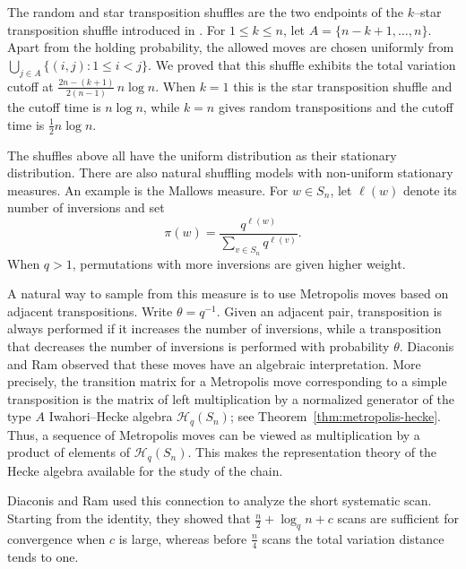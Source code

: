 \documentclass[11pt]{article}
\theoremstyle{plain}  %
\begin{document}
The random and star transposition shuffles are the two endpoints of the
$k$--star transposition shuffle introduced in
\cite{arfaee2025shuffling}. For $1\leq k\leq n$, let
$
A=\{n-k+1,\ldots,n\}.
$
Apart from the holding probability, the allowed moves are chosen uniformly
from
$
\bigcup_{j\in A}\{(i,j):1\leq i<j\}.
$
We proved that this shuffle exhibits the total variation cutoff at
$
\frac{2n-(k+1)}{2(n-1)}\,n\log n.
$
When $k=1$ this is the star transposition shuffle and the cutoff time is
$n\log n$, while $k=n$ gives random transpositions and the cutoff time is
$\frac{1}{2}n\log n$.

The shuffles above all have the uniform distribution as their stationary
distribution. There are also natural shuffling models with non-uniform
stationary measures. An example is the Mallows measure. For $w\in S_n$, let
$\ell(w)$ denote its number of inversions and set
\[
    \pi(w)=\frac{q^{\ell(w)}}{\sum_{v\in S_n}q^{\ell(v)}}.
\]
When $q>1$, permutations with more inversions are given higher weight.

A natural way to sample from this measure is to use Metropolis moves based on
adjacent transpositions. Write $\theta=q^{-1}$. Given an adjacent pair,
transposition is always performed if it increases the number of inversions,
while a transposition that decreases the number of inversions is performed
with probability $\theta$. Diaconis and Ram \cite{DiaconisRam2000} observed
that these moves have an algebraic interpretation. More precisely, the
transition matrix for a Metropolis move corresponding to a simple
transposition is the matrix of left multiplication by a normalized generator
of the type $A$ Iwahori--Hecke algebra $\mathcal{H}_q(S_n)$; see
Theorem~\ref{thm:metropolis-hecke}. Thus, a sequence of Metropolis moves can be
viewed as multiplication by a product of elements of $\mathcal{H}_q(S_n)$.
This makes the representation theory of the Hecke algebra available for the
study of the chain. 

Diaconis and Ram used this connection to analyze the short systematic scan. 
Starting from the identity, they showed that
$
    \frac{n}{2}+\log_q n+c
$
scans are sufficient for convergence when $c$ is large, whereas before
$\frac{n}{4}$ scans the total variation distance tends to one.

\end{document}
